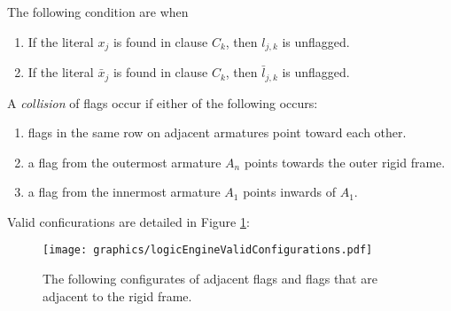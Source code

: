 The following condition are when 
\begin{enumerate}
 \item If the literal $x_j$ is found in clause $C_k$, then $l_{j,k}$ is unflagged.
 \item If the literal $\bar{x}_j$ is found in clause $C_k$, then $\bar{l}_{j,k}$ is unflagged.
\end{enumerate}
A \textit{collision} of flags occur if either of the following occurs:
\begin{enumerate}
\item flags in the same row on adjacent armatures point toward each other.
\item a flag from the outermost armature $A_n$ points towards the outer rigid frame.
\item a flag from the innermost armature $A_1$ points inwards of $A_1$.

\end{enumerate}
Valid conficurations are detailed in Figure \ref{fig:logicEngineValidConfigurations.pdf}:

\begin{figure}[!htbp]
\begin{center}
\texttt{[image: graphics/logicEngineValidConfigurations.pdf]}
\caption{The following configurates of adjacent flags 
and flags that are adjacent to the rigid frame.}\label{fig:logicEngineValidConfigurations.pdf}
\end{center}
\end{figure}

